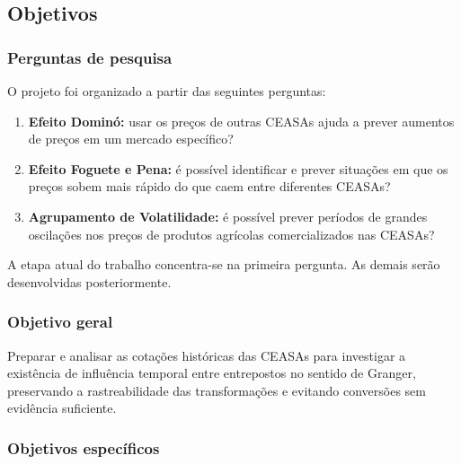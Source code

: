 \documentclass[12pt,a4paper]{article}
\begin{document}
\subsection{Objetivos}

\subsubsection{Perguntas de pesquisa}

O projeto foi organizado a partir das seguintes perguntas:

\begin{enumerate}
    \item \textbf{Efeito Dominó:} usar os preços de outras CEASAs ajuda a
    prever aumentos de preços em um mercado específico?
    \item \textbf{Efeito Foguete e Pena:} é possível identificar e prever
    situações em que os preços sobem mais rápido do que caem entre diferentes
    CEASAs?
    \item \textbf{Agrupamento de Volatilidade:} é possível prever períodos de
    grandes oscilações nos preços de produtos agrícolas comercializados nas
    CEASAs?
\end{enumerate}

A etapa atual do trabalho concentra-se na primeira pergunta. As demais serão
desenvolvidas posteriormente.

\subsubsection{Objetivo geral}

Preparar e analisar as cotações históricas das CEASAs para investigar a
existência de influência temporal entre entrepostos no sentido de Granger,
preservando a rastreabilidade das transformações e evitando conversões sem
evidência suficiente.

\subsubsection{Objetivos específicos}
\end{document}
